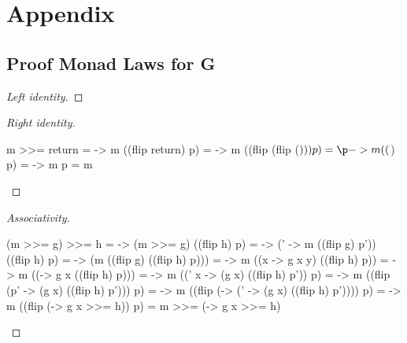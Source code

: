 \documentclass[runningheads]{llncs}
\begin{document}
%
%
%
% 
% 
%



\newpage
\section*{Appendix}
\appendix
\subsection*{Proof Monad Laws for G}\label{G-monad-laws}
\begin{proof}[Left identity]
\end{proof}
\begin{proof}[Right identity]
\begin{haskell}
m >>= return
= \p -> m ((flip return) p)
= \p -> m ((flip (flip ($))) p)
= \p -> m (($) p)
= \p -> m p
= m
\end{haskell}
\end{proof}
\begin{proof}[Associativity]
\begin{haskell}
(m >>= g) >>= h
= \p -> (m >>= g) ((flip h) p)
= \p -> (\p' -> m ((flip g) p')) ((flip h) p)
= \p -> (m ((flip g) ((flip h) p)))
= \p -> m ((\y x -> g x y) ((flip h) p))
= \p -> m ((\x -> g x ((flip h) p)))
= \p -> m ((\p' x -> (g x) ((flip h) p')) p)
= \p -> m ((flip (\x p' -> (g x) ((flip h) p'))) p)
= \p -> m ((flip (\x -> (\p' -> (g x) ((flip h) p')))) p)
= \p -> m ((flip (\x -> g x >>= h)) p)
= m >>= (\x -> g x >>= h)
\end{haskell}
\end{proof}
\end{document}
